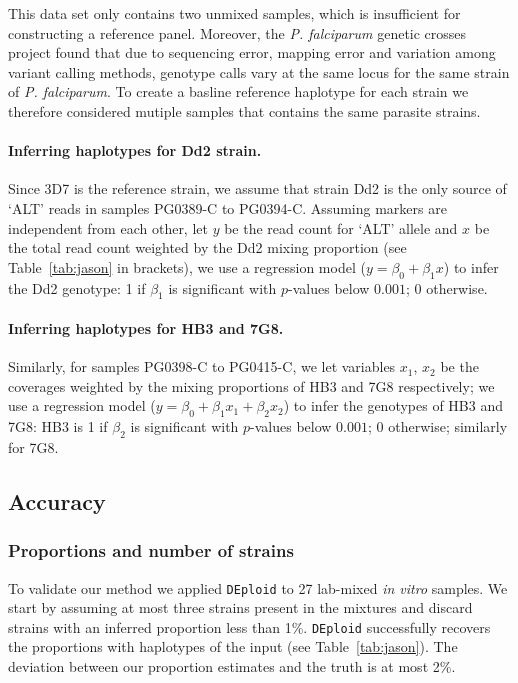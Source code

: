 \documentclass{bioinfo}
\begin{document}
This data set only contains two unmixed samples, which is insufficient for constructing a reference panel. Moreover, the {\em P. falciparum} genetic crosses project \citep{Miles2016} found that due to sequencing error, mapping error and variation among variant calling methods, genotype calls vary at the same locus for the same strain of {\it P. falciparum}. To create a basline reference haplotype for each strain we therefore considered mutiple samples that contains the same parasite strains.

\paragraph{Inferring haplotypes for Dd2 strain.}
Since 3D7 is the reference strain, we assume that strain Dd2 is the only source of `ALT' reads in samples {\textmd PG0389-C} to {\textmd PG0394-C}. Assuming markers are independent from each other, let $y$ be the read count for `ALT' allele and $x$ be the total read count weighted by the Dd2 mixing proportion (see Table~\ref{tab:jason} in brackets), we use a regression model ($y = \beta_0 + \beta_{1} x$) to infer the Dd2 genotype: 1 if $\beta_{1}$ is significant with $p$-values below $0.001$; 0 otherwise.

\paragraph{Inferring haplotypes for HB3 and 7G8.}
Similarly, for samples {\textmd PG0398-C} to {\textmd PG0415-C}, we let variables $x_1$, $x_2$ be the coverages weighted by the mixing proportions of HB3 and 7G8 respectively; we use a regression model ($y = \beta_0 + \beta_{1} x_1 + \beta_{2} x_2$) to infer the genotypes of HB3 and 7G8: HB3 is 1 if $\beta_{2}$ is significant with $p$-values below $0.001$; 0 otherwise; similarly for 7G8.


\subsection{Accuracy}

\subsubsection{Proportions and number of strains}

To validate our method we applied \texttt{DEploid} to 27 lab-mixed {\it in vitro} samples. We start by assuming at most three strains present in the mixtures and discard strains with an inferred proportion less than 1\%. \texttt{DEploid} successfully recovers the proportions with haplotypes of the input (see Table~\ref{tab:jason}). The deviation between our proportion estimates and the truth is at most 2\%.
\end{document}
